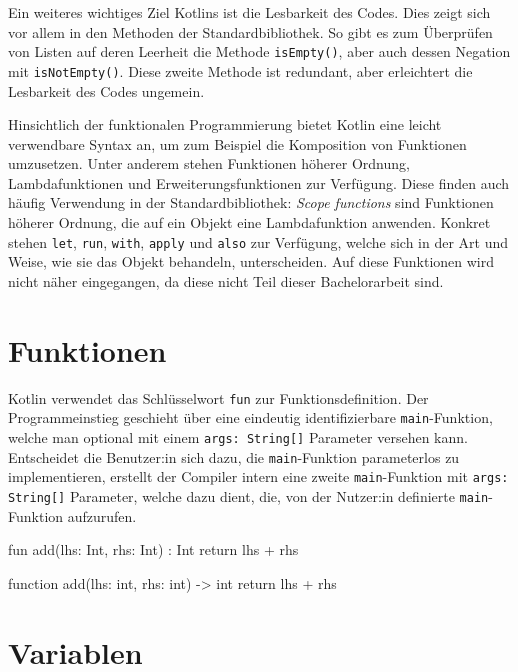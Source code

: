 Ein weiteres wichtiges Ziel Kotlins ist die Lesbarkeit des Codes. Dies zeigt sich vor allem in den Methoden der Standardbibliothek. So gibt es zum Überprüfen von Listen auf deren Leerheit die Methode \texttt{isEmpty()}, aber auch dessen Negation mit \texttt{isNotEmpty()}. Diese zweite Methode ist redundant, aber erleichtert die Lesbarkeit des Codes ungemein.

Hinsichtlich der funktionalen Programmierung bietet Kotlin eine leicht verwendbare Syntax an, um zum Beispiel die Komposition von Funktionen umzusetzen. Unter anderem stehen Funktionen höherer Ordnung, Lambdafunktionen und Erweiterungsfunktionen zur Verfügung. Diese finden auch häufig Verwendung in der Standardbibliothek: \textit{Scope functions} sind Funktionen höherer Ordnung, die auf ein Objekt eine Lambdafunktion anwenden. Konkret stehen \texttt{let}, \texttt{run}, \texttt{with}, \texttt{apply} und \texttt{also} zur Verfügung, welche sich in der Art und Weise, wie sie das Objekt behandeln, unterscheiden. Auf diese Funktionen wird nicht näher eingegangen, da diese nicht Teil dieser Bachelorarbeit sind.

\section{Funktionen}

Kotlin verwendet das Schlüsselwort \texttt{fun} zur Funktionsdefinition. Der Programmeinstieg geschieht über eine eindeutig identifizierbare \texttt{main}-Funktion, welche man optional mit einem \texttt{args: String[]} Parameter versehen kann. Entscheidet die Benutzer:in sich dazu, die \texttt{main}-Funktion parameterlos zu implementieren, erstellt der Compiler intern eine zweite \texttt{main}-Funktion mit \texttt{args: String[]} Parameter, welche dazu dient, die, von der Nutzer:in definierte \texttt{main}-Funktion aufzurufen.

\begin{KotlinCode}[numbers=none, caption={Funktion unter Kotlin}]
fun add(lhs: Int, rhs: Int) : Int {
    return lhs + rhs
}
\end{KotlinCode}

\begin{ToyaCode}[numbers=none, caption={Funktion unter toya}]
function add(lhs: int, rhs: int) -> int {
    return lhs + rhs
}
\end{ToyaCode}

\section{Variablen}

